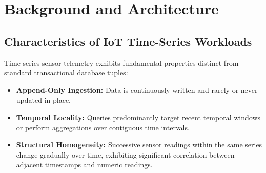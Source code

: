 \documentclass[conference,a4paper]{IEEEtran}
\begin{document}
\section{Background and Architecture}

\subsection{Characteristics of IoT Time-Series Workloads}
Time-series sensor telemetry exhibits fundamental properties distinct from standard transactional database tuples:
\begin{itemize}
    \item \textbf{Append-Only Ingestion:} Data is continuously written and rarely or never updated in place.
    \item \textbf{Temporal Locality:} Queries predominantly target recent temporal windows or perform aggregations over contiguous time intervals.
    \item \textbf{Structural Homogeneity:} Successive sensor readings within the same series change gradually over time, exhibiting significant correlation between adjacent timestamps and numeric readings.
\end{itemize}
\end{document}
